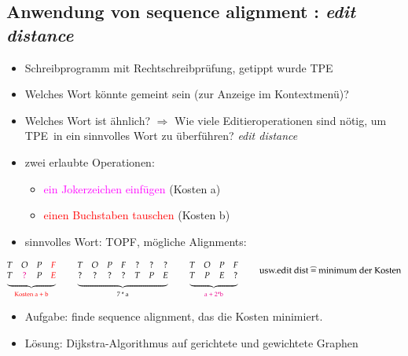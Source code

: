 \documentclass[11pt, fleqn]{scrreprt}
\begin{document}
    \subsection*{Anwendung von sequence alignment : \emph{edit distance}}
    \begin{itemize}
        \item Schreibprogramm mit Rechtschreibprüfung, getippt wurde \glqq TPE\grqq
        \item Welches Wort könnte gemeint sein (zur Anzeige im Kontextmenü)?
        \item Welches Wort ist ähnlich? $\Rightarrow$ Wie viele Editieroperationen sind nötig, um \glqq TPE\grqq \ in ein sinnvolles Wort zu überführen? \emph{edit distance}
        \item zwei erlaubte Operationen:
        \begin{itemize}
            \item \textcolor{magenta}{ein Jokerzeichen einfügen} (Kosten a)
            \item \textcolor{red}{einen Buchstaben tauschen} (Kosten b)
        \end{itemize}
        \item sinnvolles Wort: \glqq TOPF\grqq , mögliche Alignments:
    \end{itemize}
    \[ \underbrace{\begin{matrix}
    T & O & P & \textcolor{red}{F} \\
    T & \textcolor{magenta}{?} & P & \textcolor{red}{E}
    \end{matrix}}_{\text{\textcolor{red}{Kosten a + b}}}\hspace*{0.8cm}  \underbrace{\begin{matrix} T & O & P & F & ? & ? & ? \\ ? & ? & ? & ? & T & P & E \end{matrix}}_{\text{7 * a}} \hspace*{0.8cm} \underbrace{\begin{matrix} T & O & P & F \\ T & P & E & ? \end{matrix}}_{\text{\textcolor{magenta}{a + 2*b}}} \hspace*{0.8cm} \text{usw.\\ edit dist } \widehat{=} \text{ minimum der Kosten}\]

    \begin{itemize}[label={}]
        \item Aufgabe: finde sequence alignment, das die Kosten minimiert.
        \item Lösung: Dijkstra-Algorithmus auf gerichtete und gewichtete Graphen
    \end{itemize}
\end{document}
